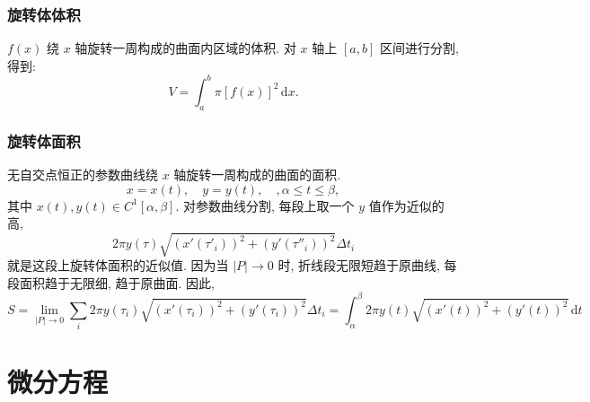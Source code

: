 \documentclass{book}
\newcommand{\dd}{\,\mathrm{d}}
\newcommand{\abs}[1]{\left\lvert #1 \right\rvert}
\renewcommand{\le}{\leqslant}
\numberwithin{equation}{section}
\numberwithin{figure}{section}
\theoremstyle{definition}
\begin{document}
\subsection{旋转体体积}
$f(x)$ 绕 $x$ 轴旋转一周构成的曲面内区域的体积. 对 $x$ 轴上 $[a,b]$ 区间进行分割, 得到:
\begin{equation*}
  V=\int_{a}^{b} \pi [f(x)]^2 \dd x.
\end{equation*}
\subsection{旋转体面积}
无自交点恒正的参数曲线绕 $x$ 轴旋转一周构成的曲面的面积.
\begin{equation*}
  x=x(t),\quad y=y(t),\quad,\alpha\le t\le\beta,
\end{equation*}
其中 $x(t),y(t)\in C^1[\alpha,\beta]$.
对参数曲线分割, 每段上取一个 $y$ 值作为近似的高, 
\begin{equation*}
  2\pi y(\tau)\sqrt{(x'(\tau'_i))^2+(y'(\tau''_i))^2}\Delta t_i
\end{equation*}
就是这段上旋转体面积的近似值. 因为当 $\abs{P}\to0$ 时, 折线段无限短趋于原曲线, 每段面积趋于无限细, 趋于原曲面.
因此,
\begin{equation*}
  S=\lim_{\abs{P}\to0}\sum_{i}^{}2\pi y(\tau_i)\sqrt{(x'(\tau_i))^2+(y'(\tau_i))^2}\Delta t_i=\int_{\alpha}^{\beta} 2\pi y(t)\sqrt{(x'(t))^2+(y'(t))^2} \dd t
\end{equation*}

\chapter{微分方程}
\end{document}

